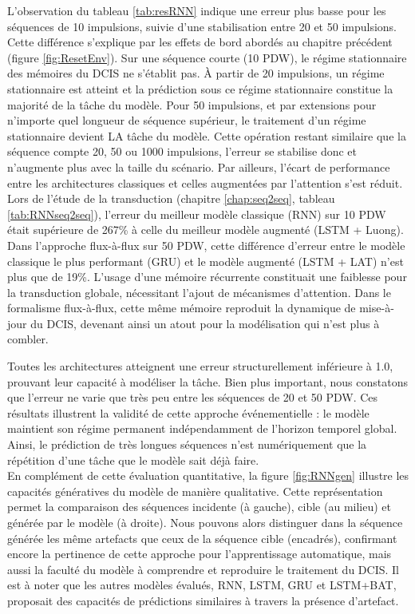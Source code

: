 L'observation du tableau \ref{tab:resRNN} indique une erreur plus basse pour les séquences de 10 impulsions, suivie d'une stabilisation entre 20 et 50 impulsions. Cette différence s'explique par les effets de bord abordés au chapitre précédent (figure \ref{fig:ResetEnv}). Sur une séquence courte (10 PDW), le régime stationnaire des mémoires du DCIS ne s'établit pas. À partir de 20 impulsions, un régime stationnaire est atteint et la prédiction sous ce régime stationnaire constitue la majorité de la tâche du modèle. Pour 50 impulsions, et par extensions pour n'importe quel longueur de séquence supérieur, le traitement d'un régime stationnaire devient LA tâche du modèle. Cette opération restant similaire que la séquence compte 20, 50 ou 1000 impulsions, l'erreur se stabilise donc et n'augmente plus avec la taille du scénario.  
Par ailleurs, l'écart de performance entre les architectures classiques et celles augmentées par l'attention s'est réduit. Lors de l'étude de la transduction (chapitre \ref{chap:seq2seq}, tableau \ref{tab:RNNseq2seq}), l'erreur du meilleur modèle classique (RNN) sur 10 PDW était supérieure de 267\% à celle du meilleur modèle augmenté (LSTM + Luong). Dans l'approche flux-à-flux sur 50 PDW, cette différence d'erreur entre le modèle classique le plus performant (GRU) et le modèle augmenté (LSTM + LAT) n'est plus que de 19\%. L'usage d'une mémoire récurrente constituait une faiblesse pour la transduction globale, nécessitant l'ajout de mécanismes d'attention. Dans le formalisme flux-à-flux, cette même mémoire reproduit la dynamique de mise-à-jour du DCIS, devenant ainsi un atout pour la modélisation qui n'est plus à combler. 

Toutes les architectures atteignent une erreur structurellement inférieure à 1.0, prouvant leur capacité à modéliser la tâche. Bien plus important, nous constatons que l'erreur ne varie que très peu entre les séquences de 20 et 50 PDW. Ces résultats illustrent la validité de cette approche événementielle : le modèle maintient son régime permanent indépendamment de l'horizon temporel global. Ainsi, le prédiction de très longues séquences n'est numériquement que la répétition d'une tâche que le modèle sait déjà faire.\\

En complément de cette évaluation quantitative, la figure \ref{fig:RNNgen} illustre les capacités génératives du modèle de manière qualitative. Cette représentation permet la comparaison des séquences incidente (à gauche), cible (au milieu) et générée par le modèle (à droite). Nous pouvons alors distinguer dans la séquence générée les même artefacts que ceux de la séquence cible (encadrés), confirmant encore la pertinence de cette approche pour l'apprentissage automatique, mais aussi la faculté du modèle à comprendre et reproduire le traitement du DCIS. Il est à noter que les autres modèles évalués, RNN, LSTM, GRU et LSTM+BAT, proposait des capacités de prédictions similaires à travers la présence d'artefact.\\

